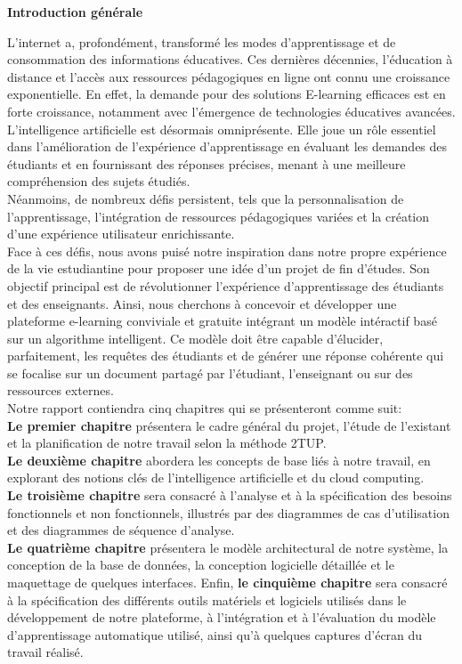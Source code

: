 \thispagestyle{plain} 
\begin{center}
  \textbf{\Huge Introduction générale}
\end{center}

\noindent L'internet a, profondément, transformé les modes d'apprentissage et de consommation des informations éducatives. Ces dernières décennies, l'éducation à distance et l'accès aux ressources pédagogiques en ligne ont connu une croissance exponentielle. En effet, la demande pour des solutions E-learning efficaces est en forte croissance, notamment avec l'émergence de technologies éducatives avancées. L’intelligence artificielle est désormais omniprésente. Elle joue un rôle essentiel dans l'amélioration de l'expérience d'apprentissage en évaluant les demandes des étudiants et en fournissant des réponses précises, menant à une meilleure compréhension des sujets étudiés.\\
\noindent Néanmoins, de nombreux défis persistent, tels que la personnalisation de l'apprentissage, l'intégration de ressources pédagogiques variées et la création d'une expérience utilisateur enrichissante. \\
\noindent Face à ces défis, nous avons puisé notre inspiration dans notre propre expérience de la vie estudiantine pour proposer une idée d’un projet de fin d’études. Son objectif principal est de révolutionner l'expérience d'apprentissage des étudiants et des enseignants. Ainsi, nous cherchons à concevoir et développer une plateforme e-learning conviviale et gratuite intégrant un modèle intéractif basé sur un algorithme intelligent. Ce modèle doit être capable d'élucider, parfaitement, les requêtes des étudiants et de générer une réponse cohérente qui se focalise sur un document partagé par l’étudiant, l’enseignant ou sur des ressources externes. \\
\noindent Notre rapport contiendra cinq chapitres qui se présenteront comme suit: \\
\textbf{Le premier chapitre} présentera le cadre général du projet, l'étude de l'existant et la planification de notre travail selon la méthode 2TUP.\\
\textbf{Le deuxième chapitre} abordera les concepts de base liés à notre travail, en explorant des notions clés de l'intelligence artificielle et du cloud computing.\\
\textbf{Le troisième chapitre} sera consacré à l'analyse et à la spécification des besoins fonctionnels et non fonctionnels, illustrés par des diagrammes de cas d'utilisation et des diagrammes de séquence d'analyse.\\
\textbf{Le quatrième chapitre} présentera le modèle architectural de notre système, la conception de la base de données, la conception logicielle détaillée et le maquettage de quelques interfaces. Enfin, \textbf{le cinquième chapitre} sera consacré à la spécification des différents outils matériels et logiciels utilisés dans le développement de notre plateforme, à l'intégration et à l'évaluation du modèle d’apprentissage automatique utilisé, ainsi qu'à quelques captures d'écran du travail réalisé.
